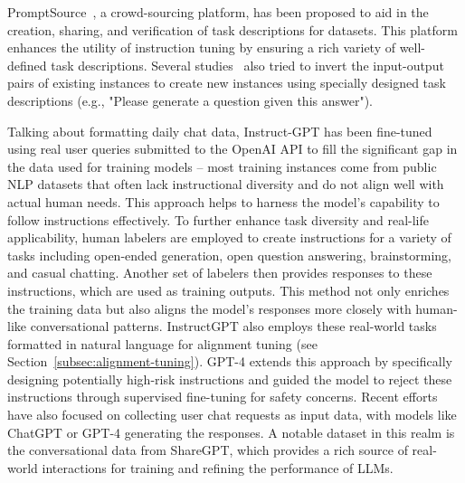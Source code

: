 PromptSource~\cite{bach2022promptsource}, a crowd-sourcing platform, has been proposed to aid in the creation, sharing, and verification of task descriptions for datasets.
This platform enhances the utility of instruction tuning by ensuring a rich variety of well-defined task descriptions.
Several studies~\cite{sanhetal2022multitask, tang2022mvp, longpre2023flan} also tried to invert the input-output pairs of existing instances to create new instances using specially designed task descriptions (e.g., "Please generate a question given this answer").

Talking about formatting daily chat data, Instruct-GPT has been fine-tuned using real user queries submitted to the OpenAI API to fill the significant gap in the data used for training models -- most training instances come from public NLP datasets that often lack instructional diversity and do not align well with actual human needs.
This approach helps to harness the model's capability to follow instructions effectively.
To further enhance task diversity and real-life applicability, human labelers are employed to create instructions for a variety of tasks including open-ended generation, open question answering, brainstorming, and casual chatting.
Another set of labelers then provides responses to these instructions, which are used as training outputs.
This method not only enriches the training data but also aligns the model's responses more closely with human-like conversational patterns.
InstructGPT also employs these real-world tasks formatted in natural language for alignment tuning (see Section~\ref{subsec:alignment-tuning}).
GPT-4 extends this approach by specifically designing potentially high-risk instructions and guided the model to reject these instructions through supervised fine-tuning for safety concerns.
Recent efforts have also focused on collecting user chat requests as input data, with models like ChatGPT or GPT-4 generating the responses.
A notable dataset in this realm is the conversational data from ShareGPT, which provides a rich source of real-world interactions for training and refining the performance of LLMs.

